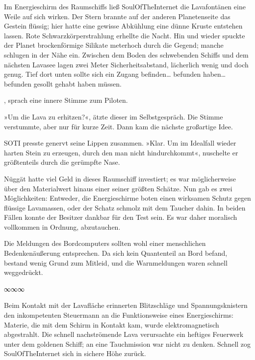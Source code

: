 Im Energieschirm des Raumschiffs ließ SoulOfTheInternet die Lavafontänen eine Weile auf sich wirken. Der Stern brannte auf der anderen Planetenseite das Gestein flüssig; hier hatte eine gewisse Abkühlung eine dünne Kruste entstehen lassen. Rote Schwarzkörperstrahlung erhellte die Nacht. Hin und wieder spuckte der Planet brockenförmige Silikate meterhoch durch die Gegend; manche schlugen in der Nähe ein. Zwischen dem Boden des schwebenden Schiffs und dem nächsten Lavasee lagen zwei Meter Sicherheitsabstand, lächerlich wenig und doch genug. Tief dort unten sollte sich ein Zugang befinden… befunden haben… befunden gesollt gehabt haben müssen.

, sprach eine innere Stimme zum Piloten.

»Um die Lava zu erhitzen?«, ätzte dieser im Selbstgespräch. Die Stimme verstummte, aber nur für kurze Zeit. Dann kam die nächste großartige Idee.


SOTI presste genervt seine Lippen zusammen. »Klar. Um im Idealfall wieder harten Stein zu erzeugen, durch den man nicht hindurchkommt«, nuschelte er größtenteils durch die gerümpfte Nase.

Nüggät hatte viel Geld in dieses Raumschiff investiert; es war möglicherweise über den Materialwert hinaus einer seiner größten Schätze. Nun gab es zwei Möglichkeiten: Entweder, die Energieschirme boten einen wirksamen Schutz gegen flüssige Lavamassen, oder der Schatz schmolz mit dem Taucher dahin. In beiden Fällen konnte der Besitzer dankbar für den Test sein. Es war daher moralisch vollkommen in Ordnung, abzutauchen.

Die Meldungen des Bordcomputers sollten wohl einer menschlichen Bedenkenäußerung entsprechen. Da sich kein Quantenteil an Bord befand, bestand wenig Grund zum Mitleid, und die Warnmeldungen waren schnell weggedrückt.

\begin{center}
∞∞∞
\end{center}

Beim Kontakt mit der Lavafläche erinnerten Blitzschläge und Spannungsknistern den inkompetenten Steuermann an die Funktionsweise eines Energieschirms: Materie, die mit dem Schirm in Kontakt kam, wurde elektromagnetisch abgestrahlt. Die schnell nachströmende Lava verursachte ein heftiges Feuerwerk unter dem goldenen Schiff; an eine Tauchmission war nicht zu denken. Schnell zog SoulOfTheInternet sich in sichere Höhe zurück.

